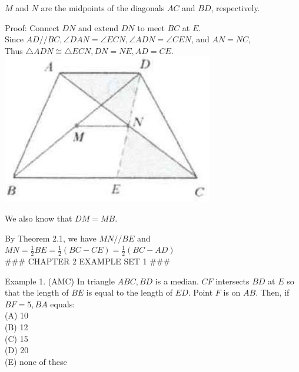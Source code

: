 \documentclass[10pt]{article}
\begin{document}
\(M\) and \(N\) are the midpoints of the diagonals \(A C\) and \(B D\), respectively.

Proof:
Connect \(D N\) and extend \(D N\) to meet \(B C\) at \(E\).\\
Since \(A D / / B C, \angle D A N=\angle E C N, \angle A D N=\angle C E N\), and \(A N=N C\),\\
Thus \(\triangle A D N \cong \triangle E C N, D N=N E, A D=C E\).\\
\includegraphics[max width=\textwidth, center]{2025_04_17_97bc1f7e44d93c271a88g-035(3)}

We also know that \(D M=M B\).

By Theorem 2.1, we have \(M N / / B E\) and\\
\(M N=\frac{1}{2} B E=\frac{1}{2}(B C-C E)=\frac{1}{2}(B C-A D)\)\\

### CHAPTER 2 EXAMPLE SET 1 ###

Example 1. (AMC) In triangle \(A B C, B D\) is a median. \(C F\) intersects \(B D\) at \(E\) so that the length of \(B E\) is equal to the length of \(E D\). Point \(F\) is on \(A B\). Then, if \(B F=5, B A\) equals:\\
(A) 10\\
(B) 12\\
(C) 15\\
(D) 20\\
(E) none of these
\end{document}
